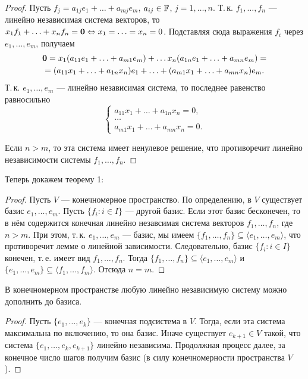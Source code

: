\begin{proof}
    Пусть $f_j = a_{1j}e_1 + \ldots + a_{mj}e_m$, $a_{ij} \in \mathbb{F}$, $j = 1, \ldots, n$. Т.\,к. $f_1, \ldots, f_n$ --- линейно независимая система векторов, то $x_1f_1 + \ldots + x_nf_n = \boldsymbol{0} \Leftrightarrow x_1 = \ldots = x_n = 0$. Подставляя сюда выражения $f_i$ через $e_1, \ldots, e_m$, получаем
    \begin{multline*}
        \boldsymbol{0} = x_1(a_{11}e_1 + \ldots + a_{m1}e_m) + \ldots x_n(a_{1n}e_1 + \ldots + a_{mn}e_m) =\\ = (a_{11}x_1 + \ldots + a_{1n}x_n)e_1 + \ldots + (a_{m1}x_1 + \ldots + a_{mn}x_n)e_m.
    \end{multline*}
    Т.\,к. $e_1, \ldots, e_m$ --- линейно независимая система, то последнее равенство равносильно
    \[
        \begin{cases}
            a_{11}x_1 + \ldots + a_{1n}x_n = 0,\\
            \ldots\\
            a_{m1}x_1 + \ldots + a_{mn}x_n = 0.
        \end{cases}
    \]

    Если $n > m$, то эта система имеет ненулевое решение, что противоречит линейно независимости системы $f_1, \ldots, f_n$.
\end{proof}

Теперь докажем теорему 1:

\begin{proof}
    Пусть $V$ --- конечномерное пространство. По определению, в $V$ существует базис $e_1, \ldots, e_m$. Пусть $\{f_i : i \in I\}$ --- другой базис. Если этот базис бесконечен, то в нём содержится конечная линейно незавсимая система векторов $f_1, \ldots, f_n$, где $n > m$. При этом, т.\,к. $e_1, \ldots, e_m$ --- базис, мы имеем $\{f_1, \ldots, f_n\} \subseteq \langle e_1, \ldots, e_m\rangle$, что противоречит лемме о линейной зависимости. Следовательно, базис $\{f_i : i \in I\}$ конечен, т.\,е. имеет вид $f_1, \ldots, f_n$. Тогда $\{f_1, \ldots, f_n\} \subseteq \langle e_1, \ldots, e_m \rangle$ и $\{e_1, \ldots, e_m\} \subseteq \langle f_1, \ldots, f_m\rangle$. Отсюда $n = m$.
\end{proof}

\begin{lemma}
    В конечномерном пространстве любую линейно независимую систему можно дополнить до базиса.
\end{lemma}

\begin{proof}
    Пусть $\{e_1, \ldots, e_k\}$ --- конечная подсистема в $V$. Тогда, если эта система максимальна по включению, то она базис. Иначе существует $e_{k + 1} \in V$ такой, что система $\{e_1, \ldots, e_k, e_{k + 1}\}$ линейно независима. Продолжная процесс далее, за конечное число шагов получим базис (в силу конечномерности пространства $V$).
\end{proof}

